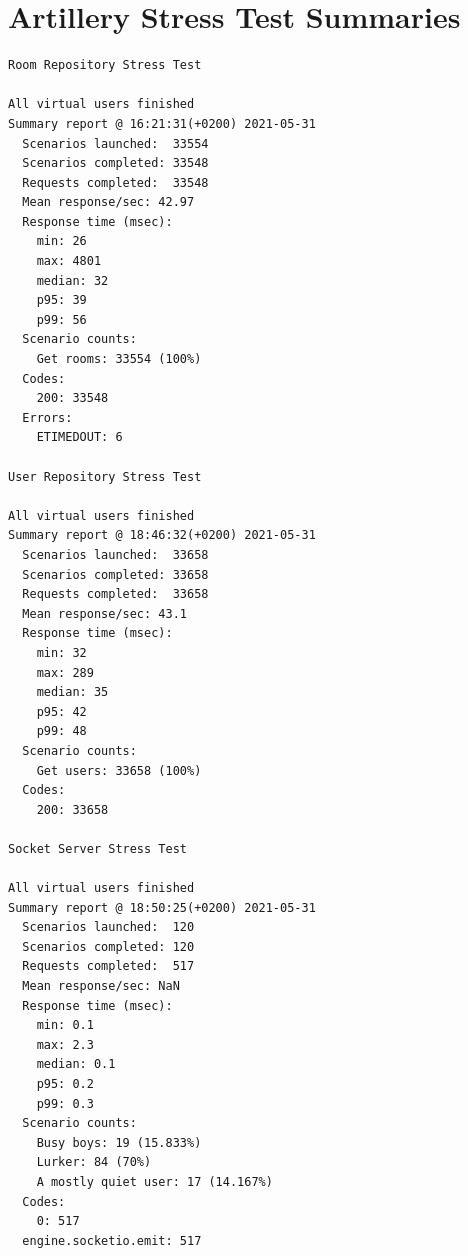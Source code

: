 \chapter{Artillery Stress Test Summaries}
\begin{lstlisting}[language=text]
Room Repository Stress Test

All virtual users finished
Summary report @ 16:21:31(+0200) 2021-05-31
  Scenarios launched:  33554
  Scenarios completed: 33548
  Requests completed:  33548
  Mean response/sec: 42.97
  Response time (msec):
    min: 26
    max: 4801
    median: 32
    p95: 39
    p99: 56
  Scenario counts:
    Get rooms: 33554 (100%)
  Codes:
    200: 33548
  Errors:
    ETIMEDOUT: 6

User Repository Stress Test

All virtual users finished
Summary report @ 18:46:32(+0200) 2021-05-31
  Scenarios launched:  33658
  Scenarios completed: 33658
  Requests completed:  33658
  Mean response/sec: 43.1
  Response time (msec):
    min: 32
    max: 289
    median: 35
    p95: 42
    p99: 48
  Scenario counts:
    Get users: 33658 (100%)
  Codes:
    200: 33658

Socket Server Stress Test

All virtual users finished
Summary report @ 18:50:25(+0200) 2021-05-31
  Scenarios launched:  120
  Scenarios completed: 120
  Requests completed:  517
  Mean response/sec: NaN
  Response time (msec):
    min: 0.1
    max: 2.3
    median: 0.1
    p95: 0.2
    p99: 0.3
  Scenario counts:
    Busy boys: 19 (15.833%)
    Lurker: 84 (70%)
    A mostly quiet user: 17 (14.167%)
  Codes:
    0: 517
  engine.socketio.emit: 517
\end{lstlisting}

